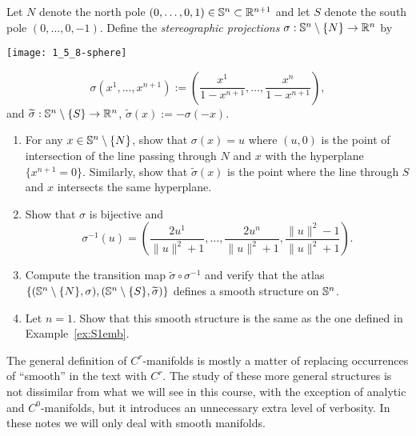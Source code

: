 \begin{exercise}\label{ex:stereo}
	Let $N$ denote the north pole $(0,\ldots,0,1)\in\mathbb{S}^n\subset\mathbb{R}^{n+1}$ and let $S$ denote the south pole $(0,\ldots,0,-1)$.
	Define the \emph{stereographic projections} $\sigma:\mathbb{S}^n\setminus\{N\}\to \mathbb{R}^n$ by
	\begin{marginfigure}
		\texttt{[image: 1\_5\_8-sphere]}
	\end{marginfigure}
	\begin{equation}
		\sigma(x^1,\ldots,x^{n+1}) := \left(\frac{x^1}{1-x^{n+1}},\ldots,\frac{x^n}{1-x^{n+1}}\right),
	\end{equation}
	and $\widetilde\sigma:\mathbb{S}^n\setminus\{S\}\to \mathbb{R}^n$, $\widetilde\sigma(x) := -\sigma(-x)$.
	\begin{enumerate}
		\item For any $x\in\mathbb{S}^n\setminus\{N\}$, show that $\sigma(x)=u$ where $(u,0)$ is the point of intersection of the line passing through $N$ and $x$ with the hyperplane $\{x^{n+1}=0\}$.
		      Similarly, show that $\widetilde\sigma(x)$ is the point where the line through $S$ and $x$ intersects the same hyperplane.
		\item Show that $\sigma$ is bijective and
		      \begin{equation}
			      \sigma^{-1}(u) = \left(\frac{2 u^1}{\|u\|^2+1}, \ldots,\frac{2 u^n}{\|u\|^2+1},\frac{\|u\|^2-1}{\|u\|^2+1}\right).
		      \end{equation}
		\item Compute the transition map $\widetilde\sigma\circ\sigma^{-1}$ and verify that the atlas $\{(\mathbb{S}^n\setminus\{N\},\sigma),(\mathbb{S}^n\setminus\{S\},\widetilde\sigma)\}$ defines a smooth structure on $\mathbb{S}^n$.
		\item Let $n=1$. Show that this smooth structure is the same as the one defined in Example~\ref{ex:S1emb}.
	\end{enumerate}
\end{exercise}

\begin{tcolorbox}
	The general definition of $C^r$-manifolds is mostly a matter of replacing occurrences of ``smooth'' in the text with $C^r$.
	The study of these more general structures is not dissimilar from what we will see in this course, with the exception of analytic and $C^0$-manifolds, but it introduces an unnecessary extra level of verbosity.
	In these notes we will only deal with smooth manifolds.
\end{tcolorbox}

